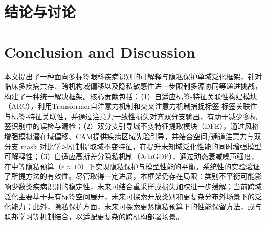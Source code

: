 \section{结论与讨论}\label{ux7ed3ux8bbaux4e0eux8ba8ux8bba}

\section*{Conclusion and Discussion}

本文提出了一种面向多标签眼科疾病识别的可解释与隐私保护单域泛化框架，针对临床多疾病共存、跨机构域偏移以及隐私敏感性进一步限制多源协同等递进挑战，构建了一种统一解决框架。核心贡献包括：（1）自适应标签-特征关联性构建模块（ARC），利用Transformer自注意力机制和交叉注意力机制捕捉标签-标签关联性与标签-特征关联性，并通过注意力一致性损失对齐双分支输出，有助于减少多标签识别中的误检与漏检；（2）双分支引导域不变特征提取模块（DFE），通过风格增强模拟潜在域偏移、CAM提供疾病区域先验引导，并结合空间/通道注意力与双分支 mask 对比学习机制提取域不变特征，在提升未知域泛化性能的同时增强模型可解释性；（3）自适应高斯差分隐私机制（AdaGDP），通过动态衰减噪声强度，在中等隐私预算（\(\epsilon \approx 10\)）下实现隐私保护与模型性能的平衡。系统性的实验验证了所提方法的有效性。尽管取得一定进展，本框架仍存在局限：类别不平衡可能影响少数类疾病识别的稳定性，未来可结合重采样或损失加权进一步缓解；当前跨域泛化主要基于共有标签空间展开，未来可探索开放类别和更复杂分布外场景下的泛化能力；此外，隐私保护方面，未来可探索更紧隐私预算下的性能保留方法，或与联邦学习等机制结合，以适配更复杂的跨机构部署场景。

